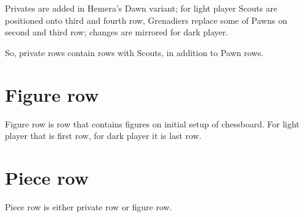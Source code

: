 Privates are added in Hemera's Dawn variant; for light player Scouts are positioned
onto third and fourth row, Grenadiers replace some of Pawns on second and third row;
changes are mirrored for dark player.

So, private rows contain rows with Scouts, in addition to Pawn rows.

\section*{Figure row}
\label{sec:Terms/Figure row}
Figure row is row that contains figures on initial setup of chessboard.
For light player that is first row, for dark player it is last row.

\section*{Piece row}
\label{sec:Terms/Piece row}
Piece row is either private row or figure row.

\clearpage %
